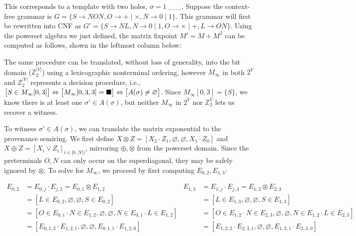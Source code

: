 \documentclass[popl.tex]{subfiles}
\begin{document}
\noindent This corresponds to a template with two holes, $\sigma = 1$ \_ \_. Suppose the context-free grammar is $G=\{S\rightarrow N O N, O \rightarrow + \mid \times, N \rightarrow 0 \mid 1\}$. This grammar will first be rewritten into CNF as $G'= \{S \rightarrow N L, N \rightarrow 0 \mid 1, O \rightarrow \times \mid +, L \rightarrow O N\}$. Using the powerset algebra we just defined, the matrix fixpoint $M' = M + M^2$ can be computed as follows, shown in the leftmost column below:\vspace{0.3cm}



\vspace{8pt}The same procedure can be translated, without loss of generality, into the bit domain ($\mathbb{Z}_2^{|V|}$) using a lexicographic nonterminal ordering, however $M_\infty$ in both $2^V$ and $\mathbb{Z}_2^{|V|}$ represents a decision procedure, i.e., $\big[S\in M_\infty[0, 3]\big]\Leftrightarrow \big[M_\infty[0, 3, 3]=\blacksquare\big] \Leftrightarrow \big[A(\sigma) \neq \varnothing\big]$. Since $M_\infty[0, 3] = \{S\}$, we know there is at least one $\sigma' \in A(\sigma)$, but neither $M_\infty$ in $2^V$ nor $\mathbb{Z}_2^V$ lets us recover a witness.


To witness $\sigma' \in A(\sigma)$, we can translate the matrix exponential to the provenance semiring. We first define $X \otimes Z = [X_2 \cdot Z_1, \varnothing, \varnothing, X_1 \cdot Z_0]$ and $X \oplus Z = [X_i \lor Z_i]_{i \in [0, |V|)}$, mirroring $\oplus, \otimes$ from the powerset domain. Since the preterminals $O, N$ can only occur on the superdiagonal, they may be safely ignored by $\otimes$. To solve for $M_\infty$, we proceed by first computing $E_{0, 2}, E_{1, 3}$:\vspace{-8pt}

\begin{small}
\begin{align*}
  E_{0, 2} &= E_{0, j} \cdot E_{j, 2} = E_{0, 1} \otimes E_{1, 2}                         &  E_{1, 3} &= E_{1, j} \cdot E_{j, 3} = E_{1, 2} \otimes E_{2, 3}\\
  &= [L \in E_{0, 2}, \varnothing, \varnothing, S \in E_{0, 2}]                                           &  &= [L \in E_{1, 3}, \varnothing, \varnothing, S \in E_{1, 3}]\\
  &= [O \in E_{0, 1} \cdot N \in E_{1, 2}, \varnothing, \varnothing, N \in E_{0, 1} \cdot L \in E_{1, 2}] &  &= [O \in E_{1, 2} \cdot N \in E_{2, 3}, \varnothing, \varnothing, N \in E_{1, 2} \cdot L \in E_{2, 3}]\\
  &= [E_{0, 1, 2} \cdot E_{1, 2, 1}, \varnothing, \varnothing, E_{0, 1, 1} \cdot E_{1, 2, 0}]             &  &= [E_{1, 2, 2} \cdot E_{2, 3, 1}, \varnothing, \varnothing, E_{1, 2, 1} \cdot E_{2, 3, 0}]
\end{align*}
\end{small}\vspace{-8pt}
\end{document}
